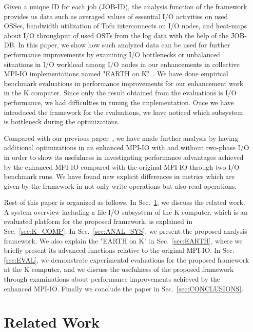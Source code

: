 \documentclass{jhps}
\begin{document}
Given a unique ID for each job (JOB-ID), the analysis function of the framework
provides us data such as averaged values of essential I/O activities on used OSSes,
bandwidth utilization of Tofu interconnects on I/O nodes, and heat-maps about
I/O throughput of used OSTs from the log data with the help of the JOB-DB.
In this paper, we show how such analyzed data can be used for further
performance improvements by examining I/O bottlenecks or unbalanced situations
in I/O workload among I/O nodes in our enhancements in collective MPI-IO implementations
named "EARTH on K"~\cite{tsujita:WS_EuroMPI2014,tsujita:hpcasia18}.
We have done empirical benchmark evaluations in performance improvements
for our enhancement work in the K computer.
Since only the result obtained from the evaluations is I/O performance,
we had difficulties in tuning the implementation.
Once we have introduced the framework for the evaluations,
we have noticed which subsystem is bottleneck during the optimizations.

Compared with our previous paper~\cite{tsujita:hpc_iodc20},
we have made further analysis by having additional
optimizations in an enhanced MPI-IO with and without two-phase I/O
in order to show its usefulness
in investigating performance advantages achieved by
the enhanced MPI-IO compared with the original MPI-IO
through two I/O benchmark runs.
We have found new explicit differences in metrics which are given by the framework
in not only write operations but also read operations.

Rest of this paper is organized as follows.
In Sec.~\ref{sec:RELATED_WORK}, we discuss the related work.
A system overview including a file I/O subsystem of the K computer,
which is an evaluated platform for the proposed framework,
is explained in Sec.~\ref{sec:K_COMP}.
In Sec.~\ref{sec:ANAL_SYS}, we present the proposed analysis framework.
We also explain the "EARTH on K" in Sec.~\ref{sec:EARTH},
where we briefly present its advanced functions relative to the original MPI-IO.
In Sec.\ref{sec:EVAL}, we demonstrate experimental evaluations
for the proposed framework at the K computer, and we discuss the usefulness
of the proposed framework through examinations about performance improvements
achieved by the enhanced MPI-IO.
Finally we conclude the paper in Sec.~\ref{sec:CONCLUSIONS}.

\section{Related Work}
\label{sec:RELATED_WORK}
\end{document}
